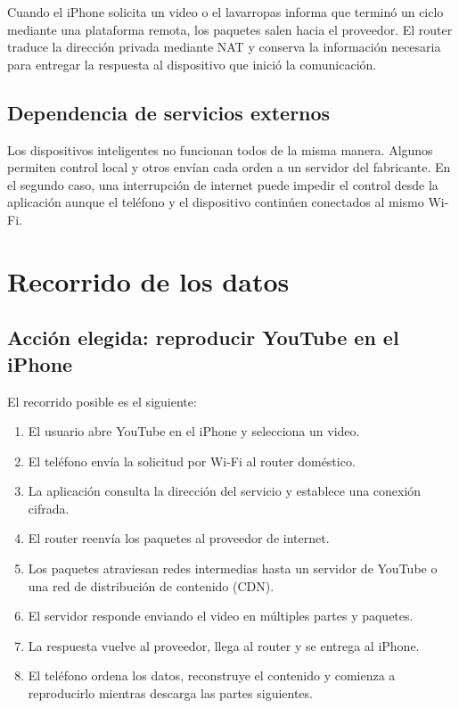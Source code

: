 \documentclass[11pt,a4paper]{article}
\begin{document}
Cuando el iPhone solicita un video o el lavarropas informa que terminó un ciclo mediante una plataforma remota, los paquetes salen hacia el proveedor. El router traduce la dirección privada mediante NAT y conserva la información necesaria para entregar la respuesta al dispositivo que inició la comunicación.

\subsection*{Dependencia de servicios externos}

Los dispositivos inteligentes no funcionan todos de la misma manera. Algunos permiten control local y otros envían cada orden a un servidor del fabricante. En el segundo caso, una interrupción de internet puede impedir el control desde la aplicación aunque el teléfono y el dispositivo continúen conectados al mismo Wi-Fi.

\newpage
\section*{Recorrido de los datos}

\subsection*{Acción elegida: reproducir YouTube en el iPhone}

El recorrido posible es el siguiente:

\begin{enumerate}
  \item El usuario abre YouTube en el iPhone y selecciona un video.
  \item El teléfono envía la solicitud por Wi-Fi al router doméstico.
  \item La aplicación consulta la dirección del servicio y establece una conexión cifrada.
  \item El router reenvía los paquetes al proveedor de internet.
  \item Los paquetes atraviesan redes intermedias hasta un servidor de YouTube o una red de distribución de contenido (CDN).
  \item El servidor responde enviando el video en múltiples partes y paquetes.
  \item La respuesta vuelve al proveedor, llega al router y se entrega al iPhone.
  \item El teléfono ordena los datos, reconstruye el contenido y comienza a reproducirlo mientras descarga las partes siguientes.
\end{enumerate}
\end{document}
